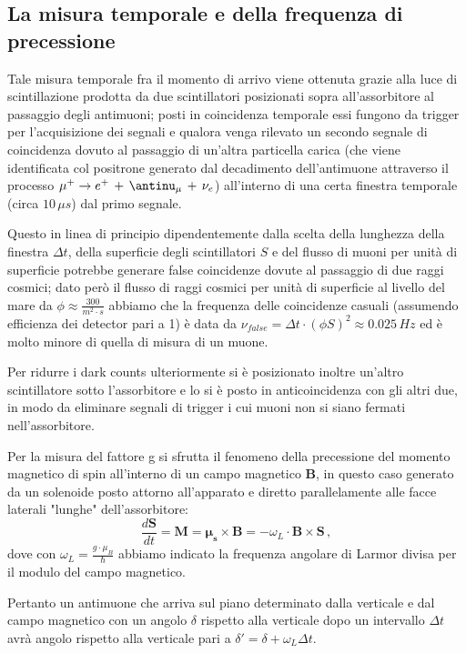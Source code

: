 \subsection{La misura temporale e della frequenza di precessione}
Tale misura temporale fra il momento di arrivo viene ottenuta grazie alla luce di scintillazione prodotta da due scintillatori posizionati sopra all'assorbitore al passaggio degli antimuoni; posti in coincidenza temporale essi fungono da trigger per l'acquisizione dei segnali e qualora venga rilevato un secondo segnale di coincidenza dovuto al passaggio di un'altra particella carica (che viene identificata col positrone generato dal decadimento dell'antimuone attraverso il processo $\mu^+ \to e^+ \, + \, \antinu_{\mu} \, + \, \nu_e$) all'interno di una certa finestra temporale (circa $10 \, \mu s$) dal primo segnale. \par
Questo in linea di principio dipendentemente dalla scelta della lunghezza della finestra $\Delta t$, della superficie degli scintillatori $S$ e del flusso di muoni per unità di superficie potrebbe generare false coincidenze dovute al passaggio di due raggi cosmici; dato però il flusso di raggi cosmici per unità di superficie al livello del mare da $\phi \approx\frac{300}{m^2 \cdot s}$ \cite{bib:Patrignani:2016xqp} abbiamo che la frequenza delle coincidenze casuali (assumendo efficienza dei detector pari a 1) è data da $\nu_{false}=\Delta t \cdot (\phi S)^2 \approx 0.025 \, Hz$ ed è molto minore di quella di misura di un muone. \par
Per ridurre i dark counts ulteriormente si è posizionato inoltre un'altro scintillatore sotto l'assorbitore e lo si è posto in anticoincidenza con gli altri due, in modo da eliminare segnali di trigger i cui muoni non si siano fermati nell'assorbitore. \par
Per la misura del fattore g si sfrutta il fenomeno della precessione del momento magnetico di spin all'interno di un campo magnetico $\mathbf{B}$, in questo caso generato da un solenoide posto attorno all'apparato e diretto parallelamente alle facce laterali "lunghe" dell'assorbitore:
\begin{equation}
\frac{d\mathbf{S}}{dt}=\mathbf{M}=\bm{\mu_s}\times\mathbf{B}=-\omega_L \cdot \mathbf{B}\times\mathbf{S} \, ,
\end{equation}
dove con $\omega_L=\frac{g \cdot \mu_B}{\hbar}$ abbiamo indicato la frequenza angolare di Larmor divisa per il modulo del campo magnetico. \par
Pertanto un antimuone che arriva sul piano determinato dalla verticale e dal campo magnetico con un angolo $\delta$ rispetto alla verticale dopo un intervallo $\Delta t$ avrà angolo rispetto alla verticale pari a $\delta '=\delta + \omega_L \Delta t$. \par
